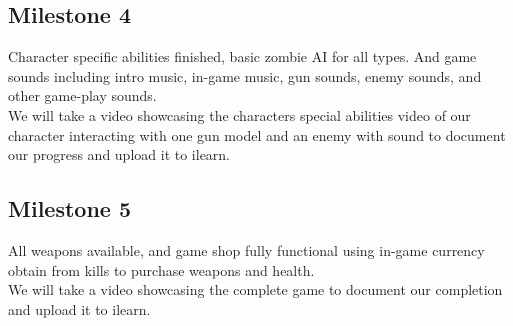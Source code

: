 \documentclass{article}
\begin{document}
\subsection{Milestone 4}
    Character specific abilities finished, basic zombie AI for all types. And game sounds including intro music, in-game music, gun sounds, enemy sounds, and other game-play sounds.  
    \\We will take a video showcasing the characters special abilities  video of our character interacting with one gun model and an enemy with sound to document our progress and upload it to ilearn. 

\subsection{Milestone 5}
    All weapons available, and game shop fully functional using in-game currency obtain from kills to purchase weapons and health.
    \\We will take a video showcasing the complete game to document our completion and upload it to ilearn. 
\end{document}
